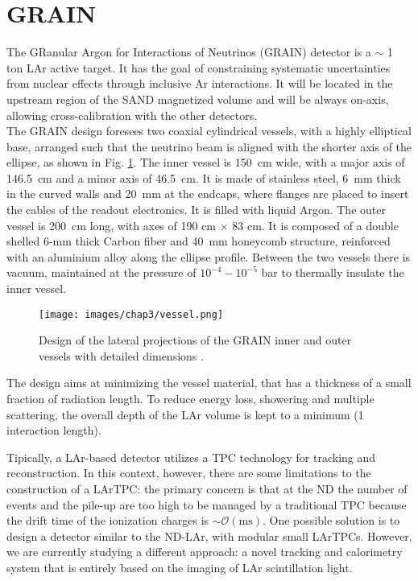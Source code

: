 \section{GRAIN}
The GRanular Argon for Interactions of Neutrinos (GRAIN) detector is a $\sim$ 1 ton LAr active target. It has the goal of constraining systematic uncertainties from nuclear effects through inclusive Ar interactions. It will be located in the upstream region of the SAND magnetized volume and will be always on-axis, allowing cross-calibration with the other detectors.\\ 
The GRAIN design foresees two coaxial cylindrical vessels, with a highly elliptical base, arranged such that the neutrino beam is aligned with the shorter axis of the ellipse, as shown in Fig. \ref{fig:vessel}. The inner vessel is 150~cm wide, with a major axis of 146.5~cm and a minor axis of 46.5~cm. It is made of stainless steel, 6~mm thick in the curved walls and 20~mm at the endcaps, where flanges are placed to insert the cables of the readout electronics. It is filled with liquid Argon. The outer vessel is 200~cm long, with axes of 190 cm $\times$ 83 cm. It is composed of a double shelled 6-mm thick Carbon fiber and 40~mm honeycomb structure, reinforced with an aluminium alloy along the ellipse profile. Between the two vessels there is vacuum, maintained at the pressure of $10^{-4} - 10^{-5}$ bar to thermally insulate the inner vessel. 

\begin{figure}
    \centering
    \texttt{[image: images/chap3/vessel.png]}
    \caption{Design of the lateral projections of the GRAIN inner and outer vessels with detailed dimensions \cite{tesi-cicero}.}
    \label{fig:vessel}
\end{figure}

The design aims at minimizing the vessel material, that has a thickness of a small fraction of radiation length. To reduce energy loss, showering and multiple scattering, the overall depth of the LAr volume is kept to a minimum (1 interaction length). 

Tipically, a LAr-based detector utilizes a TPC technology for tracking and reconstruction. In this context, however, there are some limitations to the construction of a LArTPC: the primary concern is that at the ND the number of events and the pile-up are too high to be managed by a traditional TPC because the drift time of the ionization charges is $\sim \mathcal{O}(\text{ms})$. One possible solution is to design a detector similar to the ND-LAr, with modular small LArTPCs. However, we are currently studying a different approach: a novel tracking and calorimetry system that is entirely based on the imaging of LAr scintillation light.

